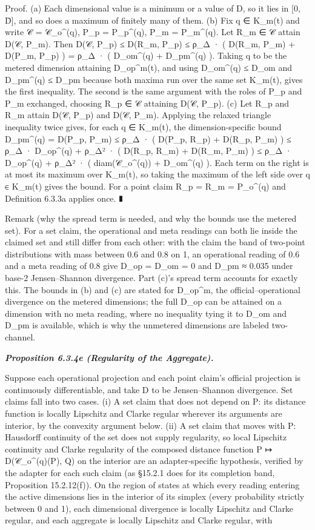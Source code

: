 \documentclass[
]{article}
\begin{document}
Proof. (a) Each dimensional value is a minimum or a value of D, so it
lies in {[}0, D̄{]}, and so does a maximum of finitely many of them. (b)
Fix q ∈ K\_m(t) and write 𝒞 = 𝒞\_o\^{}(q), P\_p = P\_p\^{}(q), P\_m =
P\_m\^{}(q). Let R\_m ∈ 𝒞 attain D(𝒞, P\_m). Then D(𝒞, P\_p) ≤ D(R\_m,
P\_p) ≤ ρ\_Δ · ( D(R\_m, P\_m) + D(P\_m, P\_p) ) = ρ\_Δ · ( D\_om\^{}(q)
+ D\_pm\^{}(q) ). Taking q to be the metered dimension attaining
D\_op\^{}m(t), and using D\_om\^{}(q) ≤ D\_om and D\_pm\^{}(q) ≤ D\_pm
because both maxima run over the same set K\_m(t), gives the first
inequality. The second is the same argument with the roles of P\_p and
P\_m exchanged, choosing R\_p ∈ 𝒞 attaining D(𝒞, P\_p). (c) Let R\_p and
R\_m attain D(𝒞, P\_p) and D(𝒞, P\_m). Applying the relaxed triangle
inequality twice gives, for each q ∈ K\_m(t), the dimension-specific
bound D\_pm\^{}(q) = D(P\_p, P\_m) ≤ ρ\_Δ · ( D(P\_p, R\_p) + D(R\_p,
P\_m) ) ≤ ρ\_Δ · D\_op\^{}(q) + ρ\_Δ² · ( D(R\_p, R\_m) + D(R\_m, P\_m)
) ≤ ρ\_Δ · D\_op\^{}(q) + ρ\_Δ² · ( diam(𝒞\_o\^{}(q)) + D\_om\^{}(q) ).
Each term on the right is at most its maximum over K\_m(t), so taking
the maximum of the left side over q ∈ K\_m(t) gives the bound. For a
point claim R\_p = R\_m = P\_o\^{}(q) and Definition 6.3.3a applies
once. ∎

Remark (why the spread term is needed, and why the bounds use the
metered set). For a set claim, the operational and meta readings can
both lie inside the claimed set and still differ from each other: with
the claim the band of two-point distributions with mass between 0.6 and
0.8 on 1, an operational reading of 0.6 and a meta reading of 0.8 give
D\_op = D\_om = 0 and D\_pm ≈ 0.035 under base-2 Jensen--Shannon
divergence. Part (c)'s spread term accounts for exactly this. The bounds
in (b) and (c) are stated for D\_op\^{}m, the official--operational
divergence on the metered dimensions; the full D\_op can be attained on
a dimension with no meta reading, where no inequality tying it to D\_om
and D\_pm is available, which is why the unmetered dimensions are
labeled two-channel.

\emph{\textbf{Proposition 6.3.4e (Regularity of the Aggregate).}}

Suppose each operational projection and each point claim's official
projection is continuously differentiable, and take D to be
Jensen--Shannon divergence. Set claims fall into two cases. (i) A set
claim that does not depend on P: its distance function is locally
Lipschitz and Clarke regular wherever its arguments are interior, by the
convexity argument below. (ii) A set claim that moves with P: Hausdorff
continuity of the set does not supply regularity, so local Lipschitz
continuity and Clarke regularity of the composed distance function P ↦
D(𝒞\_o\^{}(q)(P), Q) on the interior are an adapter-specific hypothesis,
verified by the adapter for each such claim (as §15.2.1 does for its
completion band, Proposition 15.2.12(f)). On the region of states at
which every reading entering the active dimensions lies in the interior
of its simplex (every probability strictly between 0 and 1), each
dimensional divergence is locally Lipschitz and Clarke regular, and each
aggregate is locally Lipschitz and Clarke regular, with
\end{document}
